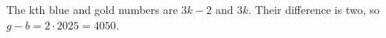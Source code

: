 The kth blue and gold numbers are $3k-2$ and $3k$. Their difference is two, so $g-b=2\cdot2025=\boxed{4050}$.

